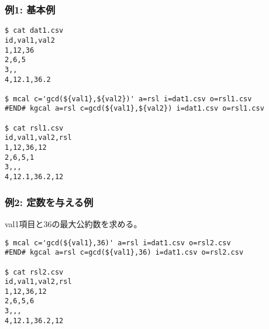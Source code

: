 
\subsubsection*{例1: 基本例}


\begin{Verbatim}[baselinestretch=0.7,frame=single]
$ cat dat1.csv
id,val1,val2
1,12,36
2,6,5
3,,
4,12.1,36.2

$ mcal c='gcd(${val1},${val2})' a=rsl i=dat1.csv o=rsl1.csv
#END# kgcal a=rsl c=gcd(${val1},${val2}) i=dat1.csv o=rsl1.csv

$ cat rsl1.csv
id,val1,val2,rsl
1,12,36,12
2,6,5,1
3,,,
4,12.1,36.2,12
\end{Verbatim}

\subsubsection*{例2: 定数を与える例}

val1項目と36の最大公約数を求める。

\begin{Verbatim}[baselinestretch=0.7,frame=single]
$ mcal c='gcd(${val1},36)' a=rsl i=dat1.csv o=rsl2.csv
#END# kgcal a=rsl c=gcd(${val1},36) i=dat1.csv o=rsl2.csv

$ cat rsl2.csv
id,val1,val2,rsl
1,12,36,12
2,6,5,6
3,,,
4,12.1,36.2,12
\end{Verbatim}
